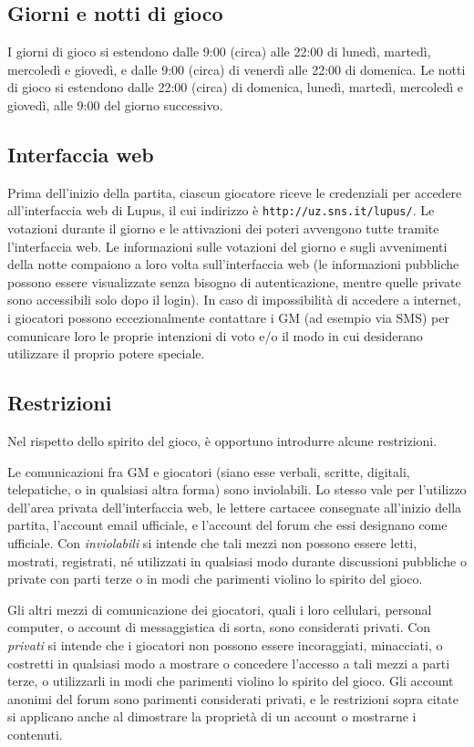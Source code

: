 \documentclass[a4paper,10pt]{article}
\begin{document}
\subsection{Giorni e notti di gioco}

I giorni di gioco si estendono dalle 9:00 (circa) alle 22:00 di lunedì, martedì, mercoledì e giovedì, e dalle 9:00 (circa) di venerdì alle 22:00 di domenica. Le notti di gioco si estendono dalle 22:00 (circa) di domenica, lunedì, martedì, mercoledì e giovedì, alle 9:00 del giorno successivo.

\subsection{Interfaccia web}

Prima dell'inizio della partita, ciascun giocatore riceve le credenziali per accedere all'interfaccia web di Lupus, il cui indirizzo è \verb|http://uz.sns.it/lupus/|.
Le votazioni durante il giorno e le attivazioni dei poteri avvengono tutte tramite l'interfaccia web. Le informazioni sulle votazioni del giorno e sugli avvenimenti della notte compaiono a loro volta sull'interfaccia web (le informazioni pubbliche possono essere visualizzate senza bisogno di autenticazione, mentre quelle private sono accessibili solo dopo il login). In caso di impossibilità di accedere a internet, i giocatori possono eccezionalmente contattare i GM (ad esempio via SMS) per comunicare loro le proprie intenzioni di voto e/o il modo in cui desiderano utilizzare il proprio potere speciale.

\subsection{Restrizioni}

Nel rispetto dello spirito del gioco, è opportuno introdurre alcune restrizioni.

Le comunicazioni fra GM e giocatori (siano esse verbali, scritte, digitali, telepatiche, o in qualsiasi altra forma) sono inviolabili. Lo stesso vale per l'utilizzo dell'area privata dell'interfaccia web, le lettere cartacee consegnate all'inizio della partita, l'account email ufficiale, e l'account del forum che essi designano come ufficiale.
Con \emph{inviolabili} si intende che tali mezzi non possono essere letti, mostrati, registrati, né utilizzati in qualsiasi modo durante discussioni pubbliche o private con parti terze o in modi che parimenti violino lo spirito del gioco.

Gli altri mezzi di comunicazione dei giocatori, quali i loro cellulari, personal computer, o account di messaggistica di sorta, sono considerati privati.
Con \emph{privati} si intende che i giocatori non possono essere incoraggiati, minacciati, o costretti in qualsiasi modo a mostrare o concedere l'accesso a tali mezzi a parti terze, o utilizzarli in modi che parimenti violino lo spirito del gioco. Gli account anonimi del forum sono parimenti considerati privati, e le restrizioni sopra citate si applicano anche al dimostrare la proprietà di un account o mostrarne i contenuti.
\end{document}
